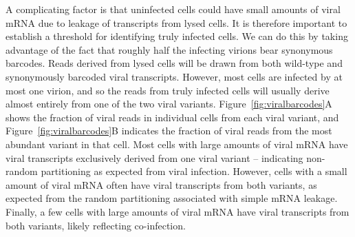 \documentclass[9pt,lineno]{elife}
\begin{document}
A complicating factor is that uninfected cells could have small amounts of viral mRNA due to leakage of transcripts from lysed cells.
It is therefore important to establish a threshold for identifying truly infected cells.
We can do this by taking advantage of the fact that roughly half the infecting virions bear synonymous barcodes.
Reads derived from lysed cells will be drawn from both wild-type and synonymously barcoded viral transcripts.
However, most cells are infected by at most one virion, and so the reads from truly infected cells will usually derive almost entirely from one of the two viral variants. 
Figure~\ref{fig:viralbarcodes}A shows the fraction of viral reads in individual cells from each viral variant, and Figure~\ref{fig:viralbarcodes}B indicates the fraction of viral reads from the most abundant variant in that cell.
Most cells with large amounts of viral mRNA have viral transcripts exclusively derived from one viral variant -- indicating non-random partitioning as expected from viral infection.
However, cells with a small amount of viral mRNA often have viral transcripts from both variants, as expected from the random partitioning associated with simple mRNA leakage.
Finally, a few cells with large amounts of viral mRNA have viral transcripts from both variants, likely reflecting co-infection.
\end{document}
